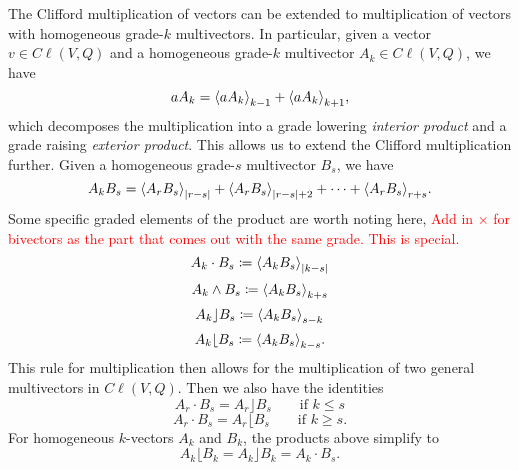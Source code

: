 \documentclass[12pt]{article}
\begin{document}
The Clifford multiplication of vectors can be extended to multiplication of vectors with homogeneous grade-$k$ multivectors.  In particular, given a vector $v \in C\ell(V,Q)$ and a homogeneous grade-$k$ multivector $A_k \in C\ell(V,Q)$, we have
\begin{equation}
\label{eq:vector_multiplication}
aA_k = \proj{k-1}{aA_k} + \proj{k+1}{aA_k},
\end{equation}
which decomposes the multiplication into a grade lowering \emph{interior product} and a grade raising \emph{exterior product}.  This allows us to extend the Clifford multiplication further. Given a homogeneous grade-$s$ multivector $B_s$, we have
\begin{equation}
\label{eq:general_clifford_multiplication}
A_k B_s = \proj{|r-s|}{A_rB_s} + \proj{|r-s|+2}{A_rB_s} + \cdots + \proj{r+s}{A_rB_s}.
\end{equation}
Some specific graded elements of the product are worth noting here, \textcolor{red}{Add in $\times$ for bivectors as the part that comes out with the same grade. This is special.}
\begin{equation}
    A_k \cdot B_s \coloneqq \proj{|k-s|}{A_k B_s}
\end{equation}
\begin{equation}
    A_k \wedge B_s \coloneqq \proj{k+s}{A_k B_s}
\end{equation}
\begin{equation}
\label{eq:left_contraction}
    A_k \rfloor B_s \coloneqq \proj{s-k}{A_k B_s}
\end{equation}
\begin{equation}
\label{eq:right_contraction}
    A_k \lfloor B_s \coloneqq \proj{k-s}{A_k B_s}.
\end{equation}
This rule for multiplication then allows for the multiplication of two general multivectors in $C\ell(V,Q)$. Then we also have the identities
\begin{equation}
\label{eq:left_contraction_dot}
A_r \cdot B_s = A_r \rfloor B_s \qquad \textrm{if $k\leq s$}
\end{equation}
\begin{equation}
\label{eq:right_contraction_dot}
A_r \cdot B_s = A_r \lfloor B_s \qquad \textrm{if $k\geq s$}.
\end{equation}
For homogeneous $k$-vectors $A_k$ and $B_k$, the products above simplify to 
\begin{equation}
\label{dot_equivalent_contraction}
    A_k \lfloor B_k = A_k \rfloor B_k = A_k \cdot B_s.
\end{equation}
\end{document}
